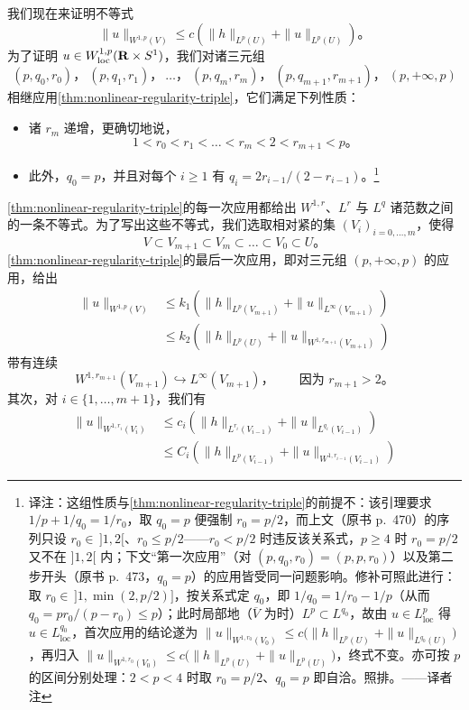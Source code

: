 我们现在来证明不等式
\[
\|u\|_{W^{1,p}(V)}\le c\left(\|h\|_{L^{p}(U)}+\|u\|_{L^{p}(U)}\right)\text{。}
\]
为了证明 $u\in W^{1,p}_{\mathrm{loc}}(\mathbf{R}\times S^{1})$，我们对诸三元组
\[
(p,q_{0},r_{0})\text{，}\ (p,q_{1},r_{1})\text{，}\ \dots\text{，}\ (p,q_{m},r_{m})\text{，}\ (p,q_{m+1},r_{m+1})\text{，}\ (p,+\infty,p)
\]
相继应用\cref{thm:nonlinear-regularity-triple}，它们满足下列性质：
\begin{itemize}
\item 诸 $r_{m}$ 递增，更确切地说，
\[
1<r_{0}<r_{1}<\dots<r_{m}<2<r_{m+1}<p\text{。}
\]
\item 此外，$q_{0}=p$，并且对每个 $i\ge 1$ 有 $q_{i}=2r_{i-1}/(2-r_{i-1})$。\footnote{译注：这组性质与\cref{thm:nonlinear-regularity-triple}的前提不\trCompatible：该引理要求 $1/p+1/q_{0}=1/r_{0}$，取 $q_{0}=p$ 便强制 $r_{0}=p/2$，而上文（原书 p.~470）的序列只设 $r_{0}\in\,]1,2[$、$r_{0}\le p/2$——$r_{0}<p/2$ 时违反该关系式，$p\ge 4$ 时 $r_{0}=p/2$ 又不在 $]1,2[$ 内；下文“第一次应用”（对 $(p,q_{0},r_{0})=(p,p,r_{0})$）以及第二步开头（原书 p.~473，$q_{0}=p$）的应用皆受同一问题影响。修补可照此进行：取 $r_{0}\in\,]1,\min(2,p/2)]$，按关系式定 $q_{0}$，即 $1/q_{0}=1/r_{0}-1/p$（从而 $q_{0}=pr_{0}/(p-r_{0})\le p$）；此时局部地（$\overline{V}$ 为\trCompact{}时）$L^{p}\subset L^{q_{0}}$，故由 $u\in L^{p}_{\mathrm{loc}}$ 得 $u\in L^{q_{0}}_{\mathrm{loc}}$，首次应用的结论遂为 $\|u\|_{W^{1,r_{0}}(V_{0})}\le c\bigl(\|h\|_{L^{p}(U)}+\|u\|_{L^{q_{0}}(U)}\bigr)$，再归入 $\|u\|_{W^{1,r_{0}}(V_{0})}\le c\bigl(\|h\|_{L^{p}(U)}+\|u\|_{L^{p}(U)}\bigr)$，终式不变。亦可按 $p$ 的区间分别处理：$2<p<4$ 时取 $r_{0}=p/2$、$q_{0}=p$ 即自洽。照排。——译者注}
\end{itemize}
\cref{thm:nonlinear-regularity-triple}的每一次应用都给出 $W^{1,r}$、$L^{r}$ 与 $L^{q}$ 诸范数之间的一条不等式。为了写出这些不等式，我们选取相对紧的\trOpen{}集 $(V_{i})_{i=0,\dots,m}$，使得
\[
V\subset V_{m+1}\subset V_{m}\subset\dots\subset V_{0}\subset U\text{。}
\]
\cref{thm:nonlinear-regularity-triple}的最后一次应用，即对三元组 $(p,+\infty,p)$ 的应用，给出
\[
\begin{aligned}
\|u\|_{W^{1,p}(V)}&\le k_{1}\left(\|h\|_{L^{p}(V_{m+1})}+\|u\|_{L^{\infty}(V_{m+1})}\right)\\
&\le k_{2}\left(\|h\|_{L^{p}(U)}+\|u\|_{W^{1,r_{m+1}}(V_{m+1})}\right)
\end{aligned}
\]
带有连续\trEmbedding
\[
W^{1,r_{m+1}}(V_{m+1})\hookrightarrow L^{\infty}(V_{m+1})\text{，}\qquad\text{因为 }r_{m+1}>2\text{。}
\]
其次，对 $i\in\{1,\dots,m+1\}$，我们有
\[
\begin{aligned}
\|u\|_{W^{1,r_{i}}(V_{i})}&\le c_{i}\left(\|h\|_{L^{r_{i}}(V_{i-1})}+\|u\|_{L^{q_{i}}(V_{i-1})}\right)\\
&\le C_{i}\left(\|h\|_{L^{p}(V_{i-1})}+\|u\|_{W^{1,r_{i-1}}(V_{i-1})}\right)
\end{aligned}
\]
